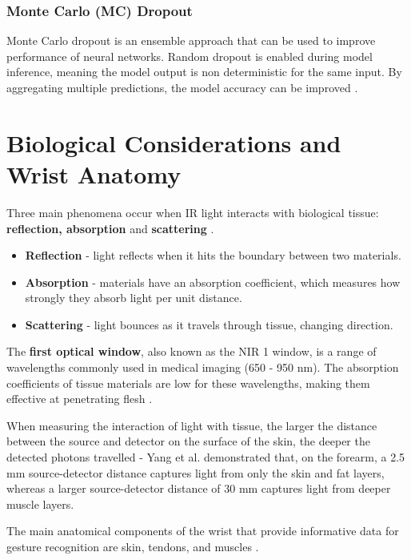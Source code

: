 \documentclass[ oneside,%
                    author={Jack Jarvis},
                    degree={BSc},
                     title={FlexIR: Flexible PCB Wristbands for Infrared Based Gesture Recognition},
                    unit={COMS30045},
                    subtitle={Investigating the Effect of LED Viewing Angle on Gesture Classification in Infrared Sensing Systems}]{dissertation}
\begin{document}
\subsubsection{Monte Carlo (MC) Dropout}
Monte Carlo dropout is an ensemble approach that can be used to improve performance of neural networks. Random dropout is enabled during model inference, meaning the model output is non deterministic for the same input. By aggregating multiple predictions, the model accuracy can be improved \cite{Milanes-Hermosilla2021MonteClassification}.

\section{Biological Considerations and Wrist Anatomy}
Three main phenomena occur when IR light interacts with biological tissue: \textbf{reflection, absorption }and\textbf{ scattering} \cite{diamand2025}.

\begin{itemize}
    \item \textbf{Reflection} - light reflects when it hits the boundary between two materials. 
    \item \textbf{Absorption} - materials have an absorption coefficient, which measures how strongly they absorb light per unit distance.
    \item \textbf{Scattering} - light bounces as it travels through tissue, changing direction.
\end{itemize}

The \textbf{first optical window}, also known as the NIR 1 window, is a range of wavelengths commonly used in medical imaging (650 - 950 nm). The absorption coefficients of tissue materials are low for these wavelengths, making them effective at penetrating flesh \cite{Smith2009SecondImaging}.

When measuring the interaction of light with tissue, the larger the distance between the source and detector on the surface of the skin, the deeper the detected photons travelled - Yang et al. \cite{Yang2007QuantitativeSpectroscopy} demonstrated that, on the forearm, a 2.5 mm source-detector distance captures light from only the skin and fat layers, whereas a larger source-detector distance of 30 mm captures light from deeper muscle layers.

The main anatomical components of the wrist that provide informative data for gesture recognition are skin, tendons, and muscles \cite{diamand2025}.
\end{document}

